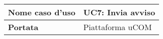
\begin{longtable}{|l|l|}
	\hline
	\textbf{Nome caso d'uso}                                                                          & UC7: Invia avviso                                                                                                                                                                                                                                                                                                                                                                                                                                                                                                                                                                                                                                                                                                                                                                                                                                                                                                                                                                                                                                                                                                                                            \\ \hline
	\endfirsthead
	\endhead
	\textbf{Portata}                                                                                  & Piattaforma uCOM                                                                                                                                                                                                                                                                                                                                                                                                                                                                                                                                                                                                                                                                                                                                                                                                                                                                                                                                                                                                                                                                                                                                             \\ \hline

\end{longtable}
